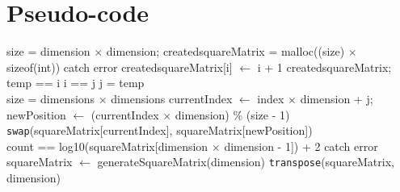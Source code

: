 \documentclass[10pt,twocolumn]{witseiepaper}
\begin{document}




\newpage
\onecolumn
{}
\setcounter{page}{1}
\begin{appendix} \label{sec:appendix}
	
\section{Pseudo-code}

\begin{algorithm}[htbp]
	\begin{algorithmic}
		
		\State size = dimension $\times$ dimension;
		\State created\textunderscore squareMatrix = malloc((size) $\times$ sizeof(int))
		\State catch error
		\EndIf
		\State created\textunderscore squareMatrix[i] $\leftarrow$ i + 1
		\EndFor
		\EndFunction
		\State \Return created\textunderscore squareMatrix; \\
		
		\State temp == i
		\State i == j
		\State j = temp
		\EndFunction \\
		
		\State size = dimensions $\times$ dimensions
		\State currentIndex $\leftarrow$ index $\times$ dimension + j;
		\State newPosition $\leftarrow$ (currentIndex $\times$ dimension) \% (size - 1)
		\EndFor
		\EndFor
		\State \verb|swap|(squareMatrix[currentIndex], squareMatrix[newPosition])
		\EndFunction \\
		
		\State count == log10(squareMatrix[dimension $\times$ dimension - 1]) + 2
		\State catch error
		\EndIf
		\EndFor
		\EndFunction \\
		
		\State squareMatrix $\leftarrow$ generateSquareMatrix(dimension)
		\State \verb|transpose|(squareMatrix, dimension)
		\EndFunction \\
		

\end{algorithmic}
\end{algorithm}
\end{appendix}
\end{document}
